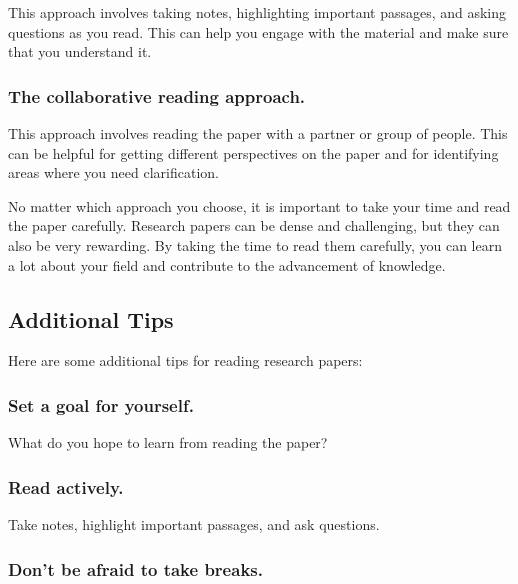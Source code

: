 \documentclass[
  b5paper]{book}
\begin{document}
This approach involves taking notes, highlighting important passages, and asking questions as you read. This can help you engage with the material and make sure that you understand it.

\hypertarget{the-collaborative-reading-approach.}{%
\subsubsection*{The collaborative reading approach.}\label{the-collaborative-reading-approach.}}

This approach involves reading the paper with a partner or group of people. This can be helpful for getting different perspectives on the paper and for identifying areas where you need clarification.

No matter which approach you choose, it is important to take your time and read the paper carefully. Research papers can be dense and challenging, but they can also be very rewarding. By taking the time to read them carefully, you can learn a lot about your field and contribute to the advancement of knowledge.

\hypertarget{additional-tips}{%
\subsection*{Additional Tips}\label{additional-tips}}

Here are some additional tips for reading research papers:

\hypertarget{set-a-goal-for-yourself.}{%
\subsubsection*{Set a goal for yourself.}\label{set-a-goal-for-yourself.}}

What do you hope to learn from reading the paper?

\hypertarget{read-actively.}{%
\subsubsection*{Read actively.}\label{read-actively.}}

Take notes, highlight important passages, and ask questions.

\hypertarget{dont-be-afraid-to-take-breaks.}{%
\subsubsection*{Don't be afraid to take breaks.}\label{dont-be-afraid-to-take-breaks.}}
\end{document}
